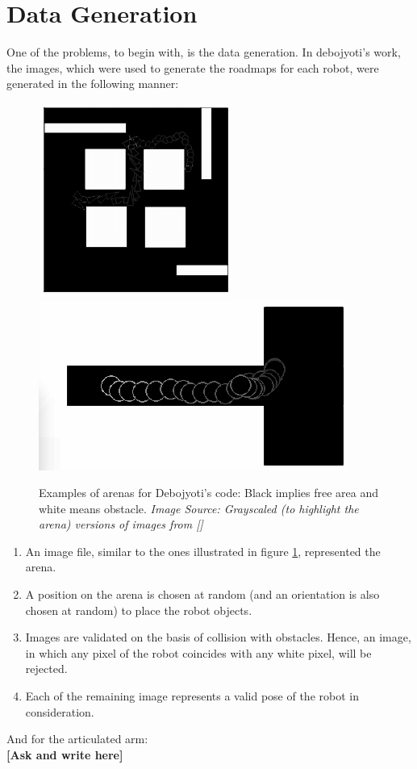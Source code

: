 \documentclass[12pt, two column]{article}
\begin{document}
\section{Data Generation}
One of the problems, to begin with, is the data generation. In debojyoti's work, the images, which were used to generate the roadmaps for each robot, were generated in the following manner:
\begin{figure}
  \includegraphics[width=0.45\linewidth]{graphics/exp1_deb}
  \includegraphics[width=0.45\linewidth]{graphics/exp2_deb}
  \caption{Examples of arenas for Debojyoti's code: Black implies free area and white means obstacle. \textit{Image Source: Grayscaled (to highlight the arena) versions of images from [\cite{deb}]}}
  \label{twoD_arenas}
\end{figure}
\begin{enumerate}
  \item An image file, similar to the ones illustrated in figure \ref{twoD_arenas}, represented the arena.
  \item A position on the arena is chosen at random (and an orientation is also chosen at random) to place the robot objects.
  \item Images are validated on the basis of collision with obstacles. Hence, an image, in which any pixel of the robot coincides with any white pixel, will be rejected.
  \item Each of the remaining image represents a valid pose of the robot in consideration.
\end{enumerate}

And for the articulated arm:\\ \textbf{[Ask and write here]}
\end{document}
